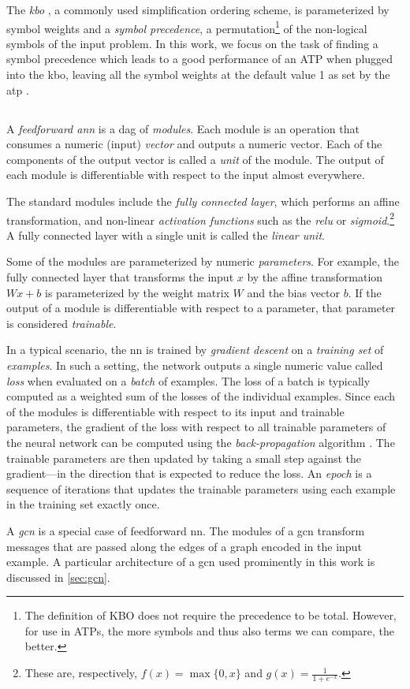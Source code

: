 The \emph{\acrfull{kbo}} \cite{Knuth1983}, a commonly used simplification ordering scheme,
is parameterized by symbol weights and a \emph{symbol precedence},
a permutation\footnote{
The definition of KBO does not require the precedence to be total. 
However, for use in ATPs, the more symbols and thus also terms 
we can compare, the better. %
} of the non-logical symbols of the input problem.
In this work, we focus on the task of finding a symbol precedence which
leads to a good performance of an ATP
when plugged into the \gls{kbo},
leaving all the symbol weights at the default 
value 1 as set by the \gls{atp} \Vampire{}.

\subsection{}

A \emph{feedforward \acrlong{ann}} \cite{DBLP:books/daglib/0040158} is a \acrlong{dag} of \emph{modules}.
Each module is an operation that consumes a numeric (input) \emph{vector} and outputs a numeric vector.
Each of the components of the output vector is called a \emph{unit} of the module.
The output of each module is differentiable with respect to the input almost everywhere.

The standard modules include
the \emph{fully connected layer}, which performs an affine transformation,
and non-linear \emph{activation functions} such as the \emph{\gls{relu}} or \emph{sigmoid}.\footnote{
These are, respectively, $f(x) = \max\{0,x\}$ and $g(x) = \frac{1}{1+e^{-x}}$.}
A fully connected layer with a single unit is called the \emph{linear unit}.

Some of the modules are parameterized by numeric \emph{parameters}.
For example, the fully connected layer that transforms the input $x$ by the affine transformation $Wx + b$
is parameterized by the weight matrix $W$ and the bias vector $b$.
If the output of a module is differentiable with respect to a parameter,
that parameter is considered \emph{trainable}.

In a typical scenario, the \acrlong{nn} is trained by \emph{gradient descent} on a \emph{training set} of \emph{examples}.
In such a setting, the network outputs a single numeric value called \emph{loss} when evaluated on a \emph{batch} of examples.
The loss of a batch is typically computed as a weighted sum of the losses of the individual examples.
Since each of the modules is differentiable with respect to its input and trainable parameters,
the gradient of the loss with respect to all trainable parameters of the neural network
can be computed using the \emph{back-propagation} algorithm \cite{DBLP:books/daglib/0040158}.
The trainable parameters are then updated by taking a small step
against the gradient---in the direction that is expected to reduce the loss.
An \emph{epoch} is a sequence of iterations that updates the trainable parameters
using each example in the training set exactly once.

A \emph{\gls{gcn}} is a special case of feedforward \acrlong{nn}.
The modules of a \gls{gcn} transform messages that are passed along the edges of a graph encoded in the input example.
A particular architecture of a \gls{gcn} used prominently in this work is discussed in \cref{sec:gcn}.

